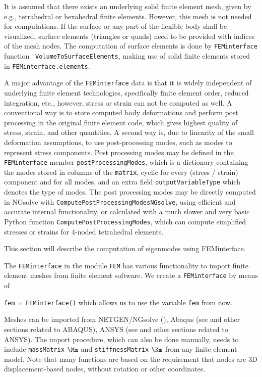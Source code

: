 It is assumed that there exists an underlying solid finite element mesh, given by e.g., tetrahedral or hexahedral finite elements. However, this mesh is not needed for computations. If the surface or any part of the flexible body shall be visualized, surface elements (triangles or quads) need to be provided with indices of the mesh nodes. The computation of surface elements is done by \texttt{FEMinterface} function \texttt{ VolumeToSurfaceElements}, making use of solid finite elements stored in \texttt{FEMinterface.elements}.

A major advantage of the \texttt{FEMinterface} data is that it is widely independent of underlying finite element technologies, specifically finite element order, reduced integration, etc., however, stress or strain can not be computed as well.
A conventional way is to store computed body deformations and perform post processing in the original finite element code, which gives highest quality of stress, strain, and other quantities.
A second way is, due to linearity of the small deformation assumptions, to use post-processing modes, such as modes to represent stress components. 
Post processing modes may be defined in the \texttt{FEMinterface} member \texttt{postProcessingModes}, which is a dictionary containing the modes stored in columns of the \texttt{matrix}, cyclic for every (stress / strain) component and for all modes, and an extra field \texttt{outputVariableType} which denotes the type of modes.
The post processing modes may be directly computed in NGsolve with \texttt{ComputePostProcessingModesNGsolve}, using efficient and accurate internal functionality, or calculated with a much slower and very basic Python function \texttt{ComputePostProcessingModes}, which can compute simplified stresses or strains for 4-noded tetrahedral elements. 


This section will describe the computation of eigenmodes using FEMinterface.

The \texttt{FEMinterface} in the module \texttt{FEM} has various functionality to import finite element meshes from finite element software.
We create a \texttt{FEMinterface} by means of
\bi
  \item[] \texttt{fem = FEMinterface()}
\ei
which allows us to use the variable \texttt{fem} from now.

Meshes can be imported from NETGEN/NGsolve (), Abaqus (see  and other sections related to ABAQUS), ANSYS (see  and other sections related to ANSYS).
The import procedure, which can also be done manually, needs to include \texttt{massMatrix} $\Mm$ and \texttt{stiffnessMatrix} $\Km$ from any finite element model.
Note that many functions are based on the requirement that nodes are 3D displacement-based nodes, without rotation or other coordinates.

